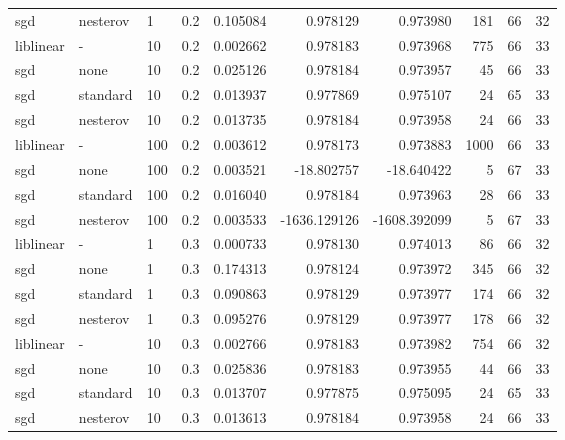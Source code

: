 \begin{tabular}{llllrrrrrr}
      sgd & nesterov &   1 &     0.2 &  0.105084 &     0.978129 &     0.973980 &     181 &          66 &        32 \\
liblinear &        - &  10 &     0.2 &  0.002662 &     0.978183 &     0.973968 &     775 &          66 &        33 \\
      sgd &     none &  10 &     0.2 &  0.025126 &     0.978184 &     0.973957 &      45 &          66 &        33 \\
      sgd & standard &  10 &     0.2 &  0.013937 &     0.977869 &     0.975107 &      24 &          65 &        33 \\
      sgd & nesterov &  10 &     0.2 &  0.013735 &     0.978184 &     0.973958 &      24 &          66 &        33 \\
liblinear &        - & 100 &     0.2 &  0.003612 &     0.978173 &     0.973883 &    1000 &          66 &        33 \\
      sgd &     none & 100 &     0.2 &  0.003521 &   -18.802757 &   -18.640422 &       5 &          67 &        33 \\
      sgd & standard & 100 &     0.2 &  0.016040 &     0.978184 &     0.973963 &      28 &          66 &        33 \\
      sgd & nesterov & 100 &     0.2 &  0.003533 & -1636.129126 & -1608.392099 &       5 &          67 &        33 \\
liblinear &        - &   1 &     0.3 &  0.000733 &     0.978130 &     0.974013 &      86 &          66 &        32 \\
      sgd &     none &   1 &     0.3 &  0.174313 &     0.978124 &     0.973972 &     345 &          66 &        32 \\
      sgd & standard &   1 &     0.3 &  0.090863 &     0.978129 &     0.973977 &     174 &          66 &        32 \\
      sgd & nesterov &   1 &     0.3 &  0.095276 &     0.978129 &     0.973977 &     178 &          66 &        32 \\
liblinear &        - &  10 &     0.3 &  0.002766 &     0.978183 &     0.973982 &     754 &          66 &        32 \\
      sgd &     none &  10 &     0.3 &  0.025836 &     0.978183 &     0.973955 &      44 &          66 &        33 \\
      sgd & standard &  10 &     0.3 &  0.013707 &     0.977875 &     0.975095 &      24 &          65 &        33 \\
      sgd & nesterov &  10 &     0.3 &  0.013613 &     0.978184 &     0.973958 &      24 &          66 &        33 \\

\end{tabular}

